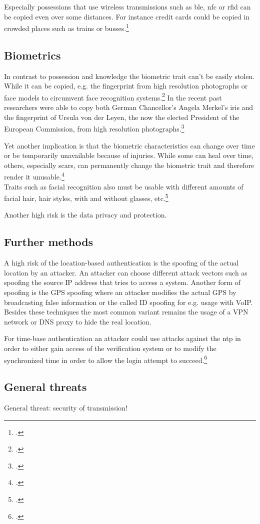 Especially possessions that use wireless transmissions such as \gls{ble}, \gls{nfc} or \gls{rfid} can be copied even over some distances. For instance credit cards could be copied in crowded places such as trains or busses.\footcite{6892730}

\subsection{Biometrics}

In contrast to possession and knowledge the biometric trait can't be easily stolen. While it can be copied, e.g. the fingerprint from high resolution photographs or 
face models to circumvent face recognition systems.\footcites[][]{185181}[][]{220566} In the recent past researchers were able to copy both German Chancellor's Angela Merkel's iris and the fingerprint of Ursula von der Leyen, the now the elected President of the European Commission, from high resolution photographs.\footcite{ccc-merkel}

Yet another implication is that the biometric characteristics can change over time or be temporarily unavailable because of injuries. While some can heal over time, others, especially scars, can permanently change the biometric trait and therefore render it unusable.\footcite[See][52]{Jain2011}\\
Traits such as facial recognition also must be usable with different amounts of facial hair, hair styles, with and without glasses, etc.\footcite[See][98]{Jain2011}

Another high risk is the data privacy and protection.

\subsection{Further methods}

A high risk of the location-based authentication is the spoofing of the actual location by an attacker. An attacker can choose different attack vectors such as spoofing the source IP address that tries to access a system. Another form of spoofing is the GPS spoofing where an attacker modifies the actual GPS by broadcasting false information or the called ID spoofing for e.g. usage with VoIP. Besides these techniques the most common variant remains the usage of a VPN network or DNS proxy to hide the real location.

For time-base authentication an attacker could use attacks against the \gls{ntp} in order to either gain access of the verification system or to modify the synchronized time in order to allow the login attempt to succeed.\footcite[See][]{malhotraattacking}

\subsection{General threats}

General threat: security of transmission!